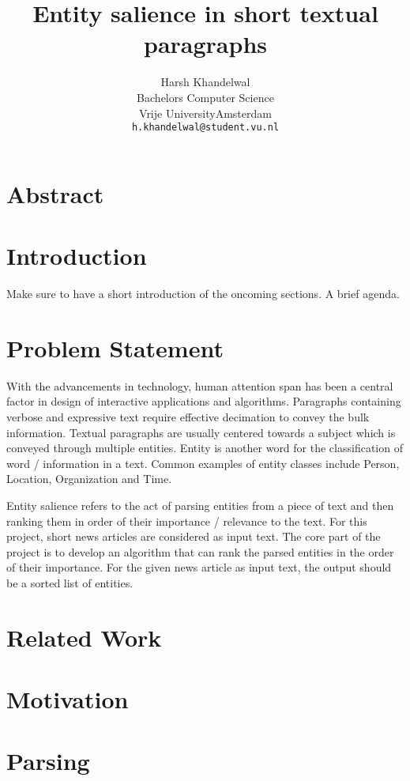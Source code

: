 \documentclass{article}
\title{Entity salience in short textual paragraphs}
\author{
	Harsh Khandelwal\\
	Bachelors Computer Science\\
	Vrije UniversityAmsterdam \\
	\texttt{h.khandelwal@student.vu.nl} \\
}
\begin{document}
	\maketitle
	
	
	\section{Abstract}
	
	\section{Introduction}
	Make sure to have a short introduction of the oncoming sections. A brief agenda.
	
	\section{Problem Statement}
	With the advancements in technology, human attention span has been a central factor in design of interactive applications and algorithms. Paragraphs containing verbose and expressive text require effective decimation to convey the bulk information. Textual paragraphs are usually centered towards a subject which is conveyed through multiple entities. Entity is another word for the classification of word / information in a text. Common examples of entity classes include Person, Location, Organization and Time.\
	
	Entity salience refers to the act of parsing entities from a piece of text and then ranking them in order of their importance / relevance to the text. For this project, short news articles are considered as input text. The core part of the project is to develop an algorithm that can rank the parsed entities in the order of their importance. For the given news article as input text, the output should be a sorted list of entities.  
	
	\section{Related Work}
	
	\section{Motivation} 
	
	\section{Parsing}
\end{document}
